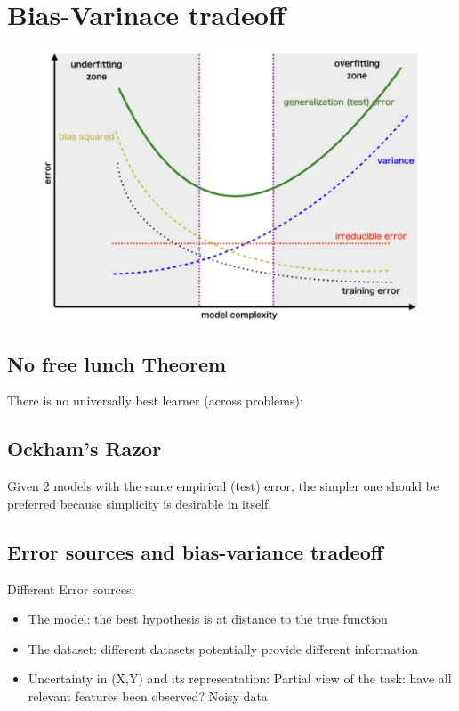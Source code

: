 \section{Bias-Varinace tradeoff}
\begin{figure}[!h]
    \includegraphics[width = \columnwidth]{figures/03/BiasVariance.png}
\end{figure}
\subsection{No free lunch Theorem}
There is no universally best learner (across problems):

\subsection{Ockham's Razor}
Given 2 models with the same empirical (test) error, the simpler one should be preferred because simplicity is desirable in itself.
\subsection{Error sources and bias-variance tradeoff}
Different Error sources:
\begin{itemize}
    \item The model: the best hypothesis is at distance to the true function
    \item The dataset: different datasets potentially provide different information
    \item Uncertainty in (X,Y) and its representation:
    \subitem Partial view of the task: have all relevant features been observed?
    \subitem Noisy data
\end{itemize}

